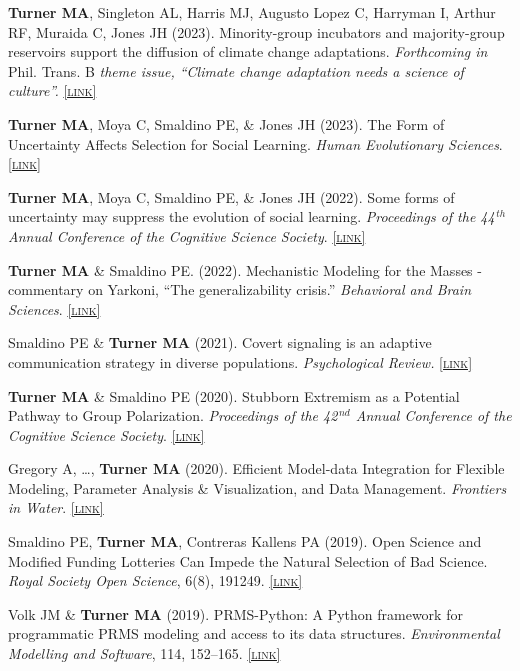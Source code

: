 \documentclass[11pt, letterpaper]{article}
\newcommand{\lurl}[1]{\href{#1}{\scriptsize\textsc{[link]}}}
\begin{document}
\setlength{\parskip}{10pt}

  \textbf{Turner MA}, Singleton AL, Harris MJ, Augusto Lopez C, Harryman I,
    Arthur RF, Muraida C, Jones JH (2023). Minority-group incubators and majority-group reservoirs
    support the diffusion of climate change adaptations. \emph{Forthcoming in} Phil. Trans. B \emph{theme issue, ``Climate
    change adaptation needs a science of culture''.} \lurl{https://osf.io/preprints/socarxiv/28eaj/}

  \textbf{Turner MA}, Moya C, Smaldino PE, \& Jones JH (2023). The Form of
  Uncertainty Affects Selection for Social Learning. \emph{Human Evolutionary Sciences}.
  \lurl{https://www.cambridge.org/core/journals/evolutionary-human-sciences/article/form-of-uncertainty-affects-selection-for-social-learning/18B581D90A78CE094194C24C59757F5B}

  \textbf{Turner MA}, Moya C, Smaldino PE, \& Jones JH (2022). Some
  forms of uncertainty may suppress the evolution of social
  learning. \emph{Proceedings of the 44$^{\,th}$ Annual Conference
  of the Cognitive Science Society}.
  \lurl{https://psyarxiv.com/dzteh/}

  \textbf{Turner MA} \& Smaldino PE. (2022). Mechanistic Modeling for the Masses - 
  commentary on Yarkoni, ``The generalizability crisis.''
  \emph{Behavioral and Brain Sciences}.
  \lurl{https://doi.org/10.1017/S0140525X2100039X}

  Smaldino PE \& \textbf{Turner MA} (2021). Covert signaling is an adaptive communication strategy in diverse populations. \emph{Psychological Review.} \lurl{https://doi.org/10.1037/rev0000344}

  \textbf{Turner MA} \& Smaldino PE (2020). Stubborn Extremism as a Potential Pathway to Group Polarization. \emph{Proceedings of the 42$^{\,nd}$ Annual Conference of the Cognitive Science Society}. \lurl{https://cogsci.mindmodeling.org/2020/papers/0153/}

    Gregory A, \ldots, \textbf{Turner MA} (2020). Efficient Model-data Integration for Flexible Modeling, Parameter Analysis \& Visualization, and Data Management. \emph{Frontiers in Water}. 
    \lurl{https://doi.org/10.3389/frwa.2020.00002}

    Smaldino PE, \textbf{Turner MA}, Contreras Kallens PA (2019). Open Science and Modified Funding Lotteries Can Impede the Natural Selection of Bad Science. \emph{Royal Society Open Science}, 6(8), 191249. \lurl{https://doi.org/10.1098/rsos.191249}

    Volk JM \& \textbf{Turner MA} (2019). PRMS-Python: A Python framework for programmatic PRMS modeling and access to its data structures. \emph{Environmental Modelling and Software}, 114, 152–165. \lurl{https://doi.org/10.1016/j.envsoft.2019.01.006}
\end{document}

